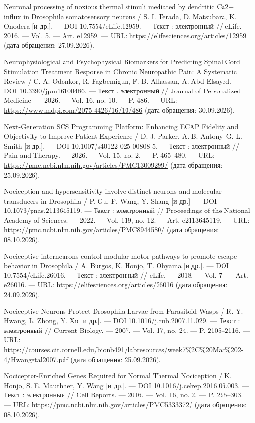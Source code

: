 \begin{list}{}{\setlength{\leftmargin}{10mm}\setlength{\labelwidth}{8mm}\setlength{\labelsep}{2mm}\setlength{\itemsep}{0pt}\setlength{\parsep}{0pt}\setlength{\topsep}{0pt}}
\item[206.] Neuronal processing of noxious thermal stimuli mediated by dendritic Ca2+ influx in Drosophila somatosensory neurons / S. I. Terada, D. Matsubara, K. Onodera [и др.]. — DOI 10.7554/eLife.12959. — Текст : электронный // eLife. — 2016. — Vol. 5. — Art. e12959. — URL: \url{https://elifesciences.org/articles/12959} (дата обращения: 27.09.2026).
\item[207.] Neurophysiological and Psychophysical Biomarkers for Predicting Spinal Cord Stimulation Treatment Response in Chronic Neuropathic Pain: A Systematic Review / C. A. Odonkor, R. Fagbemigun, F. B. Alhassan, A. Abd-Elsayed. — DOI 10.3390/jpm16100486. — Текст : электронный // Journal of Personalized Medicine. — 2026. — Vol. 16, no. 10. — P. 486. — URL: \url{https://www.mdpi.com/2075-4426/16/10/486} (дата обращения: 30.09.2026).
\item[208.] Next-Generation SCS Programming Platform: Enhancing ECAP Fidelity and Objectivity to Improve Patient Experience / D. J. Parker, A. B. Antony, G. L. Smith [и др.]. — DOI 10.1007/s40122-025-00808-5. — Текст : электронный // Pain and Therapy. — 2026. — Vol. 15, no. 2. — P. 465–480. — URL: \url{https://pmc.ncbi.nlm.nih.gov/articles/PMC13009299/} (дата обращения: 25.09.2026).
\item[209.] Nociception and hypersensitivity involve distinct neurons and molecular transducers in Drosophila / P. Gu, F. Wang, Y. Shang [и др.]. — DOI 10.1073/pnas.2113645119. — Текст : электронный // Proceedings of the National Academy of Sciences. — 2022. — Vol. 119, no. 12. — Art. e2113645119. — URL: \url{https://pmc.ncbi.nlm.nih.gov/articles/PMC8944580/} (дата обращения: 08.10.2026).
\item[210.] Nociceptive interneurons control modular motor pathways to promote escape behavior in Drosophila / A. Burgos, K. Honjo, T. Ohyama [и др.]. — DOI 10.7554/eLife.26016. — Текст : электронный // eLife. — 2018. — Vol. 7. — Art. e26016. — URL: \url{https://elifesciences.org/articles/26016} (дата обращения: 24.09.2026).
\item[211.] Nociceptive Neurons Protect Drosophila Larvae from Parasitoid Wasps / R. Y. Hwang, L. Zhong, Y. Xu [и др.]. — DOI 10.1016/j.cub.2007.11.029. — Текст : электронный // Current Biology. — 2007. — Vol. 17, no. 24. — P. 2105–2116. — URL: \url{https://courses.cit.cornell.edu/bionb491/labresources/week7\%2C\%20Mar\%202-4/Hwangetal2007.pdf} (дата обращения: 25.09.2026).
\item[212.] Nociceptor-Enriched Genes Required for Normal Thermal Nociception / K. Honjo, S. E. Mauthner, Y. Wang [и др.]. — DOI 10.1016/j.celrep.2016.06.003. — Текст : электронный // Cell Reports. — 2016. — Vol. 16, no. 2. — P. 295–303. — URL: \url{https://pmc.ncbi.nlm.nih.gov/articles/PMC5333372/} (дата обращения: 08.10.2026).

\end{list}
